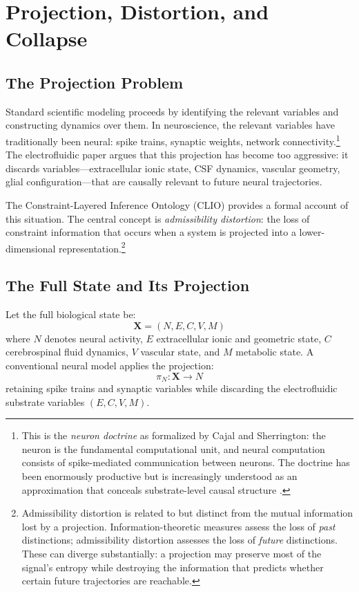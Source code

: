 \documentclass[12pt,a4paper]{article}
\begin{document}
\section{Projection, Distortion, and Collapse}
\label{sec:projection}

\subsection{The Projection Problem}

Standard scientific modeling proceeds by identifying the relevant variables and constructing dynamics over them. In neuroscience, the relevant variables have traditionally been neural: spike trains, synaptic weights, network connectivity.\footnote{This is the \emph{neuron doctrine} as formalized by Cajal and Sherrington: the neuron is the fundamental computational unit, and neural computation consists of spike-mediated communication between neurons. The doctrine has been enormously productive but is increasingly understood as an approximation that conceals substrate-level causal structure \cite{chakravarthy2026}.} The electrofluidic paper argues that this projection has become too aggressive: it discards variables---extracellular ionic state, CSF dynamics, vascular geometry, glial configuration---that are causally relevant to future neural trajectories.

The Constraint-Layered Inference Ontology (CLIO) provides a formal account of this situation. The central concept is \emph{admissibility distortion}: the loss of constraint information that occurs when a system is projected into a lower-dimensional representation.\footnote{Admissibility distortion is related to but distinct from the mutual information lost by a projection. Information-theoretic measures assess the loss of \emph{past} distinctions; admissibility distortion assesses the loss of \emph{future} distinctions. These can diverge substantially: a projection may preserve most of the signal's entropy while destroying the information that predicts whether certain future trajectories are reachable.}

\subsection{The Full State and Its Projection}

Let the full biological state be:
\[
\mathbf{X} = (N, E, C, V, M)
\]
where $N$ denotes neural activity, $E$ extracellular ionic and geometric state, $C$ cerebrospinal fluid dynamics, $V$ vascular state, and $M$ metabolic state. A conventional neural model applies the projection:
\[
\pi_N : \mathbf{X} \to N
\]
retaining spike trains and synaptic variables while discarding the electrofluidic substrate variables $(E, C, V, M)$.
\end{document}
